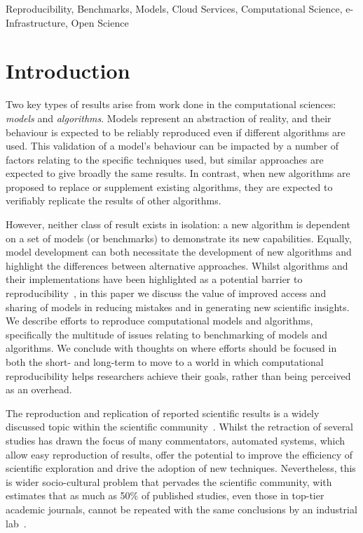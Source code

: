 \documentclass[conference]{IEEEtran}
\begin{document}
\begin{IEEEkeywords}
Reproducibility, Benchmarks, Models, Cloud Services,
Computational Science, e-Infrastructure, Open Science
\end{IEEEkeywords}

\IEEEpeerreviewmaketitle

\section{Introduction}

Two key types of results arise from work done in the computational
sciences: {\emph{models}} and {\emph{algorithms}}. Models represent an
abstraction of reality, and their behaviour is expected to be reliably
reproduced even if different algorithms are used. This validation of a
model's behaviour can be impacted by a number of factors relating to
the specific techniques used, but similar approaches are expected to
give broadly the same results.  In contrast, when new algorithms are
proposed to replace or supplement existing algorithms, they are
expected to verifiably replicate the results of other algorithms.

However, neither class of result exists in isolation: a new algorithm
is dependent on a set of models (or benchmarks) to demonstrate its new
capabilities. Equally, model development can both necessitate the
development of new algorithms and highlight the differences between
alternative approaches. Whilst algorithms and their implementations
have been highlighted as a potential barrier to
reproducibility~\cite{crick-et-al_wssspe2}, in this paper we discuss
the value of improved access and sharing of models in reducing
mistakes and in generating new scientific insights. We describe
efforts to reproduce computational models and algorithms, specifically
the multitude of issues relating to benchmarking of models and
algorithms.  We conclude with thoughts on where efforts should be
focused in both the short- and long-term to move to a world in which
computational reproducibility helps researchers achieve their goals,
rather than being perceived as an overhead.

The reproduction and replication of reported scientific results is a
widely discussed topic within the scientific
community~\cite{barnes:2010,morin-et-al:2012,joppa-et-al:2013}.
Whilst the retraction of several studies has drawn the focus of many
commentators, automated systems, which allow easy reproduction of
results, offer the potential to improve the efficiency of scientific
exploration and drive the adoption of new techniques. Nevertheless,
this is wider socio-cultural problem that pervades the scientific
community, with estimates that as much as 50\% of published studies,
even those in top-tier academic journals, cannot be repeated with the
same conclusions by an industrial lab~\cite{osherovich:2011}.
\end{document}

